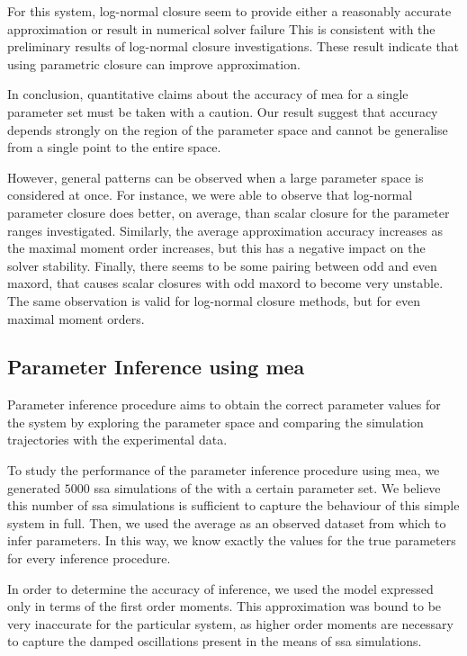 For this system, log-normal closure seem to provide either a reasonably accurate approximation or result in numerical solver failure
This is consistent with the preliminary results of log-normal closure investigations\cite{lakatos_preparation_2014}.
These result indicate that using parametric closure can improve approximation.

In conclusion, quantitative claims about the accuracy of \gls{mea} for a single parameter set must be taken with a caution.
Our result suggest that accuracy depends strongly on the region of the parameter space and cannot be generalise from a single point to the entire space.

However, general patterns can be observed when a large parameter space is considered at once. 
For instance, we were able to observe that log-normal parameter closure does better, on average, than scalar closure for the parameter ranges investigated. 
Similarly, the average approximation accuracy increases as the maximal moment order increases, but this has a negative impact on the solver stability.
Finally, there seems to be some pairing between odd and even \gls{maxord}, 
that causes scalar closures with odd \gls{maxord} to become very unstable.
The same observation is valid for log-normal closure methods, but for even maximal moment orders.



\subsection{Parameter Inference using \acrlong{mea}}
\label{sec:results:inference}
Parameter inference procedure aims to obtain the correct parameter values for the system by exploring the parameter space and comparing the simulation trajectories with the experimental data.

To study the performance of the parameter inference procedure using \acrlong{mea},
we generated $5000$ \acrfull{ssa} simulations of the \pft{} with a certain parameter set. 
We believe this number of \gls{ssa} simulations is sufficient to capture the behaviour of this simple system in full.
Then, we used the average as an observed dataset from which to infer parameters.
In this way, we know exactly the values for the true parameters for every inference procedure.

In order to determine the accuracy of inference, we used the \pft{} model expressed only in terms of the first order moments.
This approximation was bound to be very inaccurate for the particular system, as higher order moments are necessary to capture the damped oscillations present in the means of \gls{ssa} simulations\cite{ale_general_2013}.


